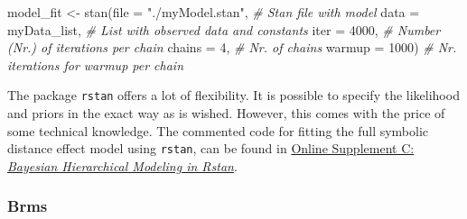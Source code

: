 \documentclass[
  english,
  doc,floatsintext]{apa6}
\newenvironment{Shaded}{\begin{snugshade}}{\end{snugshade}}
\newcommand{\AttributeTok}[1]{\textcolor[rgb]{0.77,0.63,0.00}{#1}}
\newcommand{\CommentTok}[1]{\textcolor[rgb]{0.56,0.35,0.01}{\textit{#1}}}
\newcommand{\DecValTok}[1]{\textcolor[rgb]{0.00,0.00,0.81}{#1}}
\newcommand{\FunctionTok}[1]{\textcolor[rgb]{0.00,0.00,0.00}{#1}}
\newcommand{\NormalTok}[1]{#1}
\newcommand{\OtherTok}[1]{\textcolor[rgb]{0.56,0.35,0.01}{#1}}
\newcommand{\StringTok}[1]{\textcolor[rgb]{0.31,0.60,0.02}{#1}}
\begin{document}
\scriptsize

\begin{Shaded}
\begin{Highlighting}[]
\NormalTok{model\_fit }\OtherTok{\textless{}{-}} \FunctionTok{stan}\NormalTok{(}\AttributeTok{file =} \StringTok{"./myModel.stan"}\NormalTok{,  }\CommentTok{\# Stan file with model  }
                  \AttributeTok{data =}\NormalTok{ myData\_list,       }\CommentTok{\# List with observed data and constants}
                  \AttributeTok{iter =} \DecValTok{4000}\NormalTok{,              }\CommentTok{\# Number (Nr.) of iterations per chain}
                  \AttributeTok{chains =} \DecValTok{4}\NormalTok{,               }\CommentTok{\# Nr. of chains }
                  \AttributeTok{warmup =} \DecValTok{1000}\NormalTok{)            }\CommentTok{\# Nr. iterations for warmup per chain}
\end{Highlighting}
\end{Shaded}

\normalsize

The package \texttt{rstan} offers a lot of flexibility. It is possible to specify the likelihood and priors in the exact way as is wished. However, this comes with the price of some technical knowledge. The commented code for fitting the full symbolic distance effect model using \texttt{rstan}, can be found in \href{https://github.com/MyrtheV/Bayesian-Hierarchical-Modelling-An-Introduction-and-Reassessment/blob/main/C\%20-\%20Tutorial\%20Normal\%20Model\%20Rstan/Online-Supplement-C---Bayesian-Hierarchical-Modeling-in-rstan.pdf}{Online Supplement C: \emph{Bayesian Hierarchical Modeling in Rstan}}.

\hypertarget{brms}{%
\subsubsection{Brms}\label{brms}}
\end{document}
